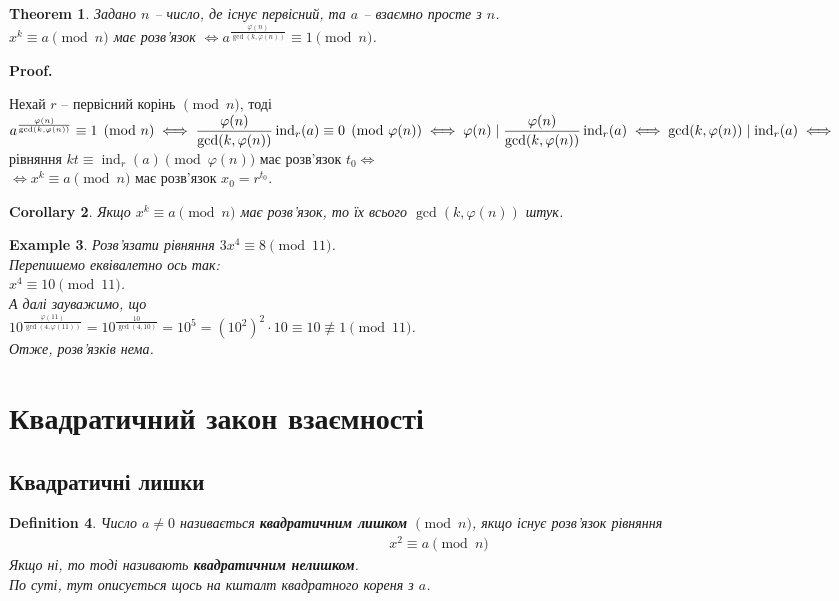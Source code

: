 \documentclass[a4paper, 14pt]{extarticle}
\makeatletter
\theoremstyle{theoremdd}
\newtheorem{theorem}{Theorem}[subsection]
\theoremstyle{theoremdd}
\newtheorem{definition}[theorem]{Definition}
\theoremstyle{theoremdd}
\theoremstyle{theoremdd}
\newtheorem{example}[theorem]{Example}
\theoremstyle{theoremdd}
\theoremstyle{theoremdd}
\theoremstyle{theoremdd}
\theoremstyle{theoremdd}
\newtheorem{corollary}[theorem]{Corollary}
\def\qed{$\blacksquare$}
\renewenvironment{proof}[1][Proof.\\]{\par
\pushQED{\hfill \qed}%
\normalfont \topsep6\p@\@plus6\p@\relax
\trivlist
\item\relax
{\bfseries
#1\@addpunct{.}}\hspace\labelsep\ignorespaces
}{%
\popQED\endtrivlist\@endpefalse
}
\DeclareMathOperator{\ind}{ind}
\makeatother
\begin{document}
\begin{theorem}
Задано $n$ -- число, де існує первісний, та $a$ -- взаємно просте з $n$.\\
$x^k \equiv a \pmod n$ має розв'язок $\iff a^{\frac{\varphi(n)}{\gcd(k,\varphi(n))}} \equiv 1 \pmod n$.
\end{theorem}

\begin{proof}
Нехай $r$ -- первісний корінь $\pmod n$, тоді\\
$a^{\frac{\varphi(n)}{\gcd(k,\varphi(n))}} \equiv 1 \pmod n \iff \dfrac{\varphi(n)}{\gcd(k,\varphi(n))} \ind_r (a) \equiv 0 \pmod {\varphi(n)} \\
\iff \varphi(n) \mid \dfrac{\varphi(n)}{\gcd(k,\varphi(n))} \ind_r(a) \iff \gcd(k,\varphi(n)) \mid \ind_r(a) \iff$\\
рівняння $kt \equiv \ind_r (a) \pmod {\varphi(n)}$ має розв'язок $t_0 \iff$\\
$\iff x^k \equiv a \pmod n$ має розв'язок $x_0 = r^{t_0}$.
\end{proof}

\begin{corollary}
Якщо $x^k \equiv a \pmod n$ має розв'язок, то їх всього $\gcd(k,\varphi(n))$ штук.
\end{corollary}

\begin{example}
Розв'язати рівняння $3x^4 \equiv 8 \pmod {11}$.\\
Перепишемо еквівалетно ось так:\\
$x^4 \equiv 10 \pmod {11}$.\\
А далі зауважимо, що \\
$10^{\frac{\varphi(11)}{\gcd(4,\varphi(11))}} = 10^{\frac{10}{\gcd(4,10)}} = 10^5 = (10^2)^2 \cdot 10 \equiv 10 \not\equiv 1 \pmod {11}$.\\
Отже, розв'язків нема.
\end{example}
\newpage

\section{Квадратичний закон взаємності}
\subsection{Квадратичні лишки}
\begin{definition}
Число $a \neq 0$ називається \textbf{квадратичним лишком} $\pmod n$, якщо існує розв'язок рівняння
\begin{align*}
x^2 \equiv a \pmod n
\end{align*}
Якщо ні, то тоді називають \textbf{квадратичним нелишком}.\\
По суті, тут описується щось на кшталт квадратного кореня з $a$.
\end{definition}
\end{document}
